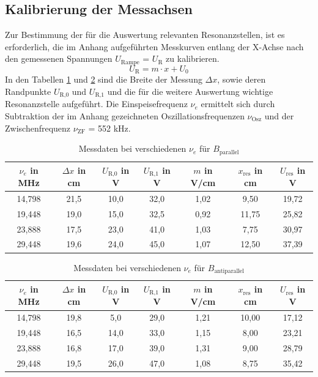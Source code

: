 \subsection{Kalibrierung der Messachsen}
\label{sec_Kalib}
Zur Bestimmung der für die Auswertung relevanten Resonanzstellen, ist es erforderlich, die im Anhang aufgeführten Messkurven entlang der X-Achse
nach den gemessenen Spannungen $U_\text{Rampe}$ = $U_\text{R}$ zu kalibrieren. 
\begin{equation}
 U_\text{R} = m\cdot x + U_0
\end{equation}
In den Tabellen \ref{tab_nueBpar} und \ref{tab_nueBantipar} sind die Breite der Messung $\Delta x$, sowie deren Randpunkte $U_\text{R,0}$ und 
$U_\text{R,1}$ und die für die weitere Auswertung wichtige Resonanzstelle aufgeführt. Die Einspeisefrequenz $\nu_e$ ermittelt sich durch Subtraktion
der im Anhang gezeichneten Oszillationsfrequenzen $\nu_\text{Osz}$ und der Zwischenfrequenz $\nu_\text{ZF}$ = 552 kHz.

\begin{table}[H]
 \begin{tabular}{c|c|c|c||c|c|c}
  $\nu_e$ in MHz & $\Delta x$ in cm & $U_\text{R,0}$ in V & $U_\text{R,1} $ in V & $m$ in V/cm & $x_{\text{res}}$ in cm & $U_\text{res}$ in V \\
 \hline
14,798&	21,5&	10,0&	32,0&	1,02&	9,50&	19,72 \\
19,448	&19,0&	15,0&	32,5&	0,92&	11,75&	25,82\\
23,888&	17,5&	23,0&	41,0&	1,03&	7,75&	30,97\\
29,448&	19,6&	24,0&	45,0&	1,07&	12,50&	37,39\\
 \end{tabular}
 \caption{Messdaten bei verschiedenen $\nu_e$ für $B_\text{parallel}$ }
 \label{tab_nueBpar}
\end{table}
\begin{table}[H]
 \begin{tabular}{c|c|c|c||c|c|c}
  $\nu_e$ in MHz & $\Delta x$ in cm & $U_\text{R,0}$ in V & $U_\text{R,1} $ in V & $m$ in V/cm & $x_{\text{res}}$ in cm & $U_\text{res}$ in V \\
 \hline
14,798&	19,8&	5,0&	29,0&	1,21&	10,00&	17,12\\
19,448&	16,5&	14,0&	33,0&	1,15&	8,00&	23,21\\
23,888&	16,8&	17,0&	39,0&	1,31&	9,00&	28,79\\
29,448&	19,5&	26,0&	47,0&	1,08&	8,75&	35,42 \\

 \end{tabular}
 \caption{Messdaten bei verschiedenen $\nu_e$ für $B_\text{antiparallel}$}
 \label{tab_nueBantipar}
\end{table}

